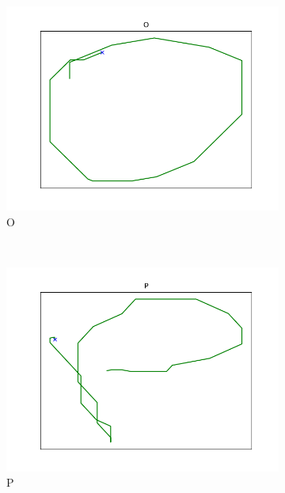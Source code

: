 \begin{figure}
\begin{subfigure}[b]{0.14\textwidth}
        \includegraphics[width=\textwidth]{images/gbem/orig_letters_fig/AORIG_letter_O_writer_2.png}
        \caption{O}
    \end{subfigure}
    ~
    \begin{subfigure}[b]{0.14\textwidth}
        \includegraphics[width=\textwidth]{images/gbem/orig_letters_fig/AORIG_letter_P_writer_11.png}
        \caption{P}
    \end{subfigure}
    ~
    \begin{subfigure}[b]{0.14\textwidth}

\end{subfigure}
\end{figure}
